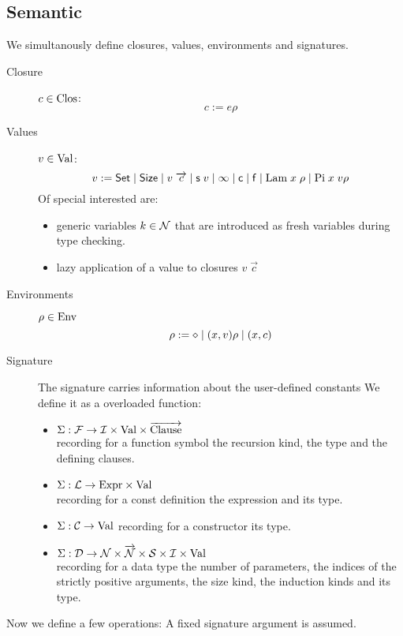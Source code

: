 \subsection{Semantic}
We simultanously define closures, values, environments and signatures.
\begin{description}
\item[Closure]
$ c \in \mathrm{Clos} $:
\[ c := e \rho \]
\item[Values]
$ v \in \mathrm{Val} $:
\[v := \mathsf{Set} \;\vert\; \mathsf{Size} \;\vert\; v \; \overrightarrow{c} \;\vert\; \mathsf{s}\; v \;\vert\; \infty \;\vert\; \mathsf{c} \;\vert\; \mathsf{f} \;\vert\; \mathrm{Lam} \; x \; \rho \;\vert\; \mathrm{Pi} \; x \; v \rho \]
Of special interested are:
\begin{itemize}
\item
generic variables $k \in \mathcal{N} $ that are introduced as fresh variables during type checking.
\item
lazy application of a value to closures  $ v \; \vec{c}$
\end{itemize}
\item[Environments]
$ \rho \in \mathrm{Env}$ \\
\[ \rho := \diamond \;\vert\; (x,v) \rho \;\vert\; (x,c) \]
\item[Signature]
The signature carries information about the user-defined constants
We define it as a overloaded function:
\begin{itemize}
\item
$ \mathrm{\Sigma} : \mathcal{F} \rightarrow \mathcal{I} \times \mathrm{Val} \times \overrightarrow{\mathrm{Clause}}$\\
recording for a function symbol the recursion kind, the type and the defining clauses.
\item
$ \mathrm{\Sigma} : \mathcal{L} \rightarrow \mathrm{Expr} \times \mathrm{Val} $ \\
recording for a const definition the expression and its type. 
\item
$ \mathrm{\Sigma} : \mathcal{C} \rightarrow \mathrm{Val} $
recording for a constructor its type.
\item
$ \mathrm{\Sigma} : \mathcal{D} \rightarrow \mathcal{N} \times \overrightarrow{\mathcal{N}} \times \mathcal{S} \times \mathcal{I} \times \mathrm{Val} $\\
recording for a data type the number of parameters, the indices of the strictly positive arguments,
the size kind, the induction kinds and its type.
\end{itemize}
\end{description}
Now we define a few operations:
A fixed signature argument is assumed.
